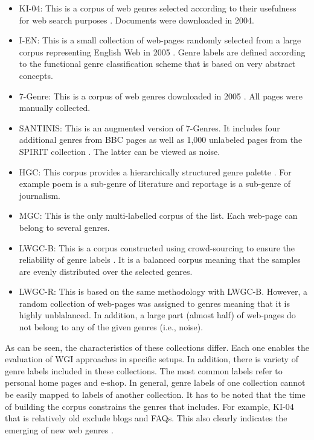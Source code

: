 \begin{itemize}
    \item KI-04: This is a corpus of web genres selected according to their usefulness for web search  purposes . Documents were downloaded in 2004.
    \item I-EN: This is a small collection of web-pages randomly selected from a large corpus representing English Web in 2005 . Genre labels are defined according to the functional genre classification scheme that is based on very abstract concepts.
    \item 7-Genre: This is a corpus of web genres downloaded in 2005 . All pages were manually collected. 
    \item SANTINIS: This is an augmented version of 7-Genres. It includes four additional genres from BBC pages as well as 1,000 unlabeled pages from the SPIRIT collection . The latter can be viewed as noise.
    \item HGC: This corpus provides a hierarchically structured genre palette  . For example poem is a sub-genre of literature and reportage is a sub-genre of journalism.
    \item MGC: This is the only multi-labelled corpus of the list. Each web-page can belong to several genres. 
    \item LWGC-B: This is a corpus constructed using crowd-sourcing to ensure the reliability of genre labels . It is a balanced corpus meaning that the samples are evenly distributed over the selected genres.
    \item LWGC-R: This is based on the same methodology with LWGC-B. However, a random collection of web-pages was assigned to genres meaning that it is highly unblalanced. In addition, a large part (almost half) of web-pages do not belong to any of the given genres (i.e., noise).
\end{itemize}

As can be seen, the characteristics of these collections differ. Each one enables the evaluation of WGI approaches in specific setups. In addition, there is variety of genre labels included in these collections. The most common labels refer to personal home pages and e-shop. In general, genre labels of one collection cannot be easily mapped to labels of another collection. It has to be noted that the time of building the corpus constrains the genres that includes. For example, KI-04 that is relatively old exclude blogs and FAQs. This also clearly indicates the emerging of new web genres \parencite{dash2018history}. 

